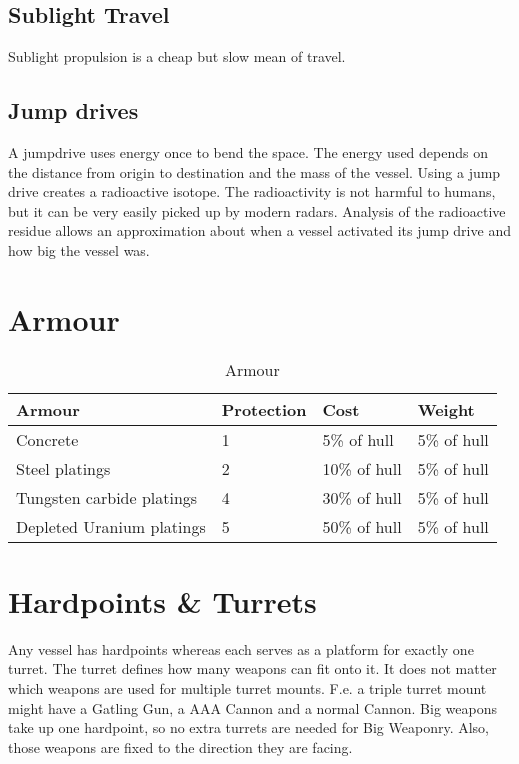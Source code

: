 \subsection{Sublight Travel}

Sublight propulsion is a cheap but slow mean of travel.

\subsection{Jump drives}

A jumpdrive uses energy once to bend the space. The energy used depends on the distance from origin to destination and the mass of the vessel. Using a jump drive creates a radioactive isotope. The radioactivity is not harmful to humans, but it can be very easily picked up by modern radars. Analysis of the radioactive residue allows an approximation about when a vessel activated its jump drive and how big the vessel was.

\section{Armour}
\label{sec:Armour}

\begin{table}[H]
  \centering
  \caption{Armour}
  \label{tab:vessel-armour}
  \begin{tabular}{|l|l|l|l|}
    \hline
    Armour                    & Protection & Cost         & Weight      \\  \hline
    Concrete                  & 1          & 5\% of hull  & 5\% of hull \\ \hline
    Steel platings            & 2          & 10\% of hull & 5\% of hull \\ \hline
    Tungsten carbide platings & 4          & 30\% of hull & 5\% of hull \\ \hline
    Depleted Uranium platings & 5          & 50\% of hull & 5\% of hull \\ \hline
  \end{tabular}
\end{table}


\section{Hardpoints \& Turrets}
\label{sec:Hardpoints & Turrets}

Any vessel has hardpoints whereas each serves as a platform for exactly one turret. The turret defines how many weapons can fit onto it. It does not matter which weapons are used for multiple turret mounts. F.e. a triple turret mount might have a Gatling Gun, a AAA Cannon and a normal Cannon. Big weapons take up one hardpoint, so no extra turrets are needed for Big Weaponry. Also, those weapons are fixed to the direction they are facing.


